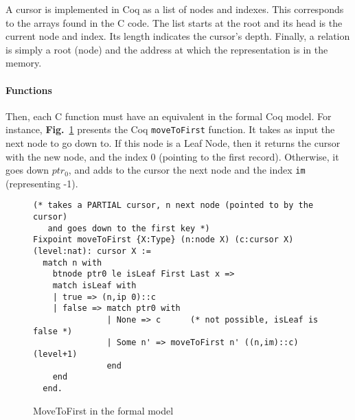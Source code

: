 A cursor is implemented in Coq as a list of nodes and indexes.
This corresponds to the arrays found in the C code. The list starts at the root and its head is the current node and index.
Its length indicates the cursor's depth.
Finally, a relation is simply a root (node) and the address at which the representation is in the memory.%

\paragraph{Functions} Then, each C function must have an equivalent in the formal Coq model.
For instance, \textbf{Fig.}~\ref{movetofirst} presents the Coq \texttt{moveToFirst} function.
It takes as input the next node to go down to. If this node is a Leaf Node, then it returns the cursor with the new node, and the index 0 (pointing to the first record).
Otherwise, it goes down $ptr_0$, and adds to the cursor the next node and the index \texttt{im} (representing -1).

\begin{figure}
\begin{lstlisting}[language=Coq]
(* takes a PARTIAL cursor, n next node (pointed to by the cursor)
   and goes down to the first key *)
Fixpoint moveToFirst {X:Type} (n:node X) (c:cursor X) (level:nat): cursor X :=
  match n with
    btnode ptr0 le isLeaf First Last x =>
    match isLeaf with
    | true => (n,ip 0)::c
    | false => match ptr0 with
               | None => c      (* not possible, isLeaf is false *)
               | Some n' => moveToFirst n' ((n,im)::c) (level+1)
               end
    end
  end.
\end{lstlisting}
\caption{MoveToFirst in the formal model}
\label{movetofirst}
\end{figure}  
